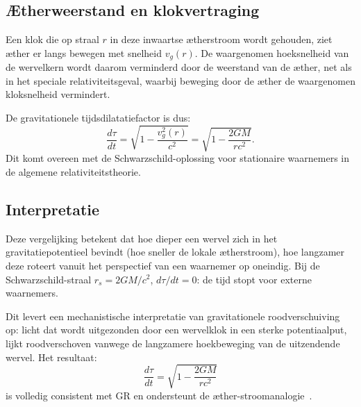 \subsection*{Ætherweerstand en klokvertraging}

Een klok die op straal $r$ in deze inwaartse ætherstroom wordt gehouden, ziet æther er langs bewegen met snelheid $v_g(r)$. De waargenomen hoeksnelheid van de wervelkern wordt daarom verminderd door de weerstand van de æther, net als in het speciale relativiteitsgeval, waarbij beweging door de æther de waargenomen kloksnelheid vermindert.

De gravitationele tijdsdilatatiefactor is dus:
\[
    \frac{d\tau}{dt} = \sqrt{1 - \frac{v_g^2(r)}{c^2}} = \sqrt{1 - \frac{2GM}{rc^2}}. \tag{4}
\]
Dit komt overeen met de Schwarzschild-oplossing voor stationaire waarnemers in de algemene relativiteitstheorie.

\subsection*{Interpretatie}

Deze vergelijking betekent dat hoe dieper een wervel zich in het gravitatiepotentieel bevindt (hoe sneller de lokale ætherstroom), hoe langzamer deze roteert vanuit het perspectief van een waarnemer op oneindig. Bij de Schwarzschild-straal $r_s = 2GM/c^2$, $d\tau/dt = 0$: de tijd stopt voor externe waarnemers.

Dit levert een mechanistische interpretatie van gravitationele roodverschuiving op: licht dat wordt uitgezonden door een wervelklok in een sterke potentiaalput, lijkt roodverschoven vanwege de langzamere hoekbeweging van de uitzendende wervel. Het resultaat:
\[
    \boxed{\frac{d\tau}{dt} = \sqrt{1 - \frac{2GM}{rc^2}}}
\]
is volledig consistent met GR en ondersteunt de æther-stroomanalogie~\cite{Schiller2022-maxforce}.